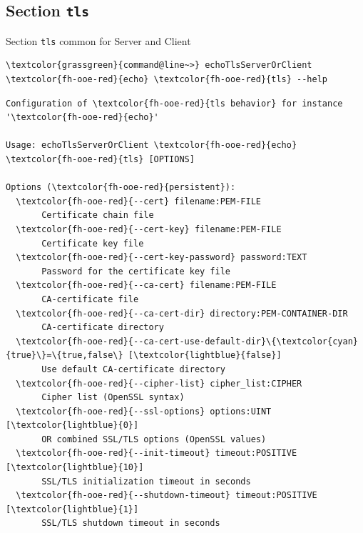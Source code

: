 \subsection{Section \textcolor{fh-ooe-red}{\lstinline|tls|}}

\begin{frame}[fragile]{Section \alert{\lstinline|tls|} common for Server and Client}
\begin{scriptsize}
\begin{Verbatim}[commandchars=\\\{\}]
\textcolor{grassgreen}{command@line~>} echoTlsServerOrClient \textcolor{fh-ooe-red}{echo} \textcolor{fh-ooe-red}{tls} --help
\end{Verbatim}
\begin{Verbatim}[commandchars=\\\{\},frame=leftline,rulecolor=\color{fh-ooe-red}]
Configuration of \textcolor{fh-ooe-red}{tls behavior} for instance '\textcolor{fh-ooe-red}{echo}'

Usage: echoTlsServerOrClient \textcolor{fh-ooe-red}{echo} \textcolor{fh-ooe-red}{tls} [OPTIONS]

Options (\textcolor{fh-ooe-red}{persistent}):
  \textcolor{fh-ooe-red}{--cert} filename:PEM-FILE
       Certificate chain file
  \textcolor{fh-ooe-red}{--cert-key} filename:PEM-FILE
       Certificate key file
  \textcolor{fh-ooe-red}{--cert-key-password} password:TEXT
       Password for the certificate key file
  \textcolor{fh-ooe-red}{--ca-cert} filename:PEM-FILE
       CA-certificate file
  \textcolor{fh-ooe-red}{--ca-cert-dir} directory:PEM-CONTAINER-DIR
       CA-certificate directory
  \textcolor{fh-ooe-red}{--ca-cert-use-default-dir}\{\textcolor{cyan}{true}\}=\{true,false\} [\textcolor{lightblue}{false}]
       Use default CA-certificate directory
  \textcolor{fh-ooe-red}{--cipher-list} cipher_list:CIPHER
       Cipher list (OpenSSL syntax)
  \textcolor{fh-ooe-red}{--ssl-options} options:UINT [\textcolor{lightblue}{0}]
       OR combined SSL/TLS options (OpenSSL values)
  \textcolor{fh-ooe-red}{--init-timeout} timeout:POSITIVE [\textcolor{lightblue}{10}]
       SSL/TLS initialization timeout in seconds
  \textcolor{fh-ooe-red}{--shutdown-timeout} timeout:POSITIVE [\textcolor{lightblue}{1}]
       SSL/TLS shutdown timeout in seconds
\end{Verbatim}
\end{scriptsize}
\end{frame}

